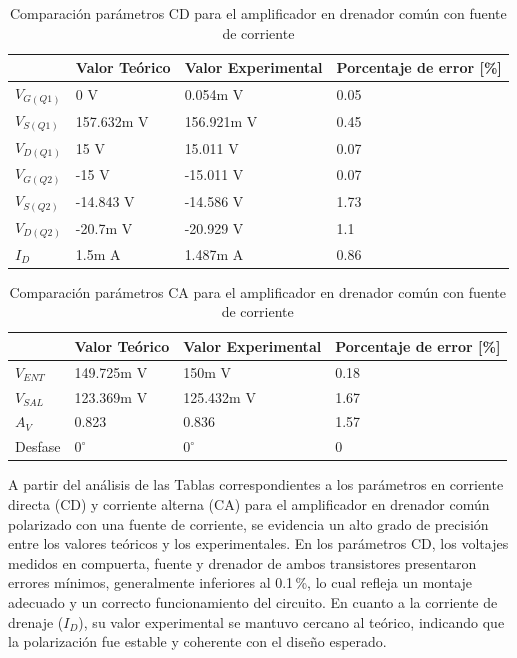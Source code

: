 \documentclass[journal]{IEEEtran}
\begin{document}
	\begin{table}[h]
		\caption{Comparación parámetros CD para el amplificador en drenador común con fuente de corriente}
		\centering
		\renewcommand{\arraystretch}{1.2} %
		\begin{tabular}{|l|p{2cm}|p{2cm}|p{2cm}|}
			\hline
			& \textbf{Valor Teórico} & \textbf{Valor Experimental} & \textbf{Porcentaje de error [\%]} \\
			\hline
			\( V_{G(Q1)} \) & 0 V  & 0.054m V  & 0.05 \\
			\hline
			\( V_{S(Q1)} \) & 157.632m V   & 156.921m V  & 0.45 \\
			\hline
			\( V_{D(Q1)} \) & 15 V & 15.011 V & 0.07 \\
			\hline
			\( V_{G(Q2)} \) & -15 V  & -15.011 V  & 0.07 \\
			\hline
			\( V_{S(Q2)} \) & -14.843 V   & -14.586 V  & 1.73 \\
			\hline
			\( V_{D(Q2)} \) & -20.7m V & -20.929 V & 1.1 \\
			\hline
			\( I_D \) & 1.5m A & 1.487m A & 0.86 \\
			\hline
		\end{tabular}
		\label{tab:resistencias}
	\end{table}
	\begin{table}[h]
		\caption{Comparación parámetros CA para el amplificador en drenador común con fuente de corriente}
		\centering
		\renewcommand{\arraystretch}{1.2} %
		\begin{tabular}{|l|p{2cm}|p{2cm}|p{2cm}|}
			\hline
			& \textbf{Valor Teórico} & \textbf{Valor Experimental} & \textbf{Porcentaje de error [\%]} \\
			\hline
			\( V_{ENT} \) & 149.725m V  & 150m V  & 0.18 \\
			\hline
			\( V_{SAL} \) & 123.369m V   & 125.432m V  & 1.67 \\
			\hline
			\( A_V \) & 0.823 & 0.836 & 1.57 \\
			\hline
			Desfase & $0^\circ$  & $0^\circ$  & 0 \\
			\hline
		\end{tabular}
		\label{tab:resistencias}
	\end{table}
	\par A partir del análisis de las Tablas correspondientes a los parámetros en corriente directa (CD) y corriente alterna (CA) para el amplificador en drenador común polarizado con una fuente de corriente, se evidencia un alto grado de precisión entre los valores teóricos y los experimentales. En los parámetros CD, los voltajes medidos en compuerta, fuente y drenador de ambos transistores presentaron errores mínimos, generalmente inferiores al 0.1\,\%, lo cual refleja un montaje adecuado y un correcto funcionamiento del circuito. En cuanto a la corriente de drenaje (\( I_D \)), su valor experimental se mantuvo cercano al teórico, indicando que la polarización fue estable y coherente con el diseño esperado.
\end{document}
